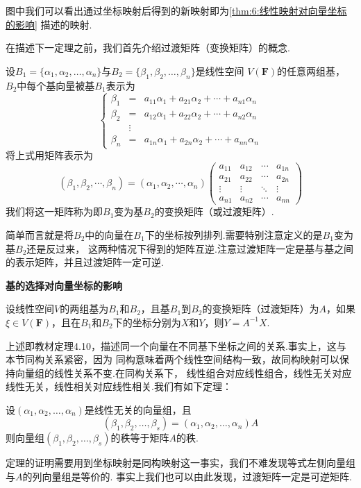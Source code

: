 图中我们可以看出通过坐标映射后得到的新映射即为\autoref{thm:6:线性映射对向量坐标的影响} 描述的映射.

在描述下一定理之前，我们首先介绍过渡矩阵（变换矩阵）的概念.
\begin{definition}
    设$B_1=\{\alpha_1,\alpha_2,\ldots,\alpha_n\}$与$B_2=\{\beta_1,\beta_2,\ldots,\beta_n\}$是线性空间
    $V(\mathbf{F})$的任意两组基，$B_2$中每个基向量被基$B_1$表示为
    \[ \left\{
    \begin{array}{rcl}
        \beta_1&=&a_{11}\alpha_1+a_{21}\alpha_2+\cdots+a_{n1}\alpha_n \\
        \beta_2&=&a_{12}\alpha_1+a_{22}\alpha_2+\cdots+a_{n2}\alpha_n \\
        &\vdots& \\
        \beta_n&=&a_{1n}\alpha_1+a_{2n}\alpha_2+\cdots+a_{nn}\alpha_n
    \end{array}
    \right. \]
    将上式用矩阵表示为
    \[(\beta_1,\beta_2,\cdots,\beta_n)=(\alpha_1,\alpha_2,\cdots,\alpha_n)\begin{pmatrix}
        a_{11} & a_{12} & \cdots & a_{1n} \\
        a_{21} & a_{22} & \cdots & a_{2n} \\
        \vdots & \vdots & \ddots & \vdots \\
        a_{n1} & a_{n2} & \cdots & a_{nn}
    \end{pmatrix}\]
    我们将这一矩阵称为即$B_1$变为基$B_2$的变换矩阵（或过渡矩阵）.
\end{definition}
简单而言就是将$B_2$中的向量在$B_1$下的坐标按列排列.需要特别注意定义的是$B_1$变为基$B_2$还是反过来，
这两种情况下得到的矩阵互逆.注意过渡矩阵一定是基与基之间的表示矩阵，并且过渡矩阵一定可逆.
\begin{theorem}
    \textbf{\heiti 基的选择对向量坐标的影响}

    设线性空间$V$的两组基为$B_1$和$B_2$，且基$B_1$到$B_2$的变换矩阵（过渡矩阵）为$A$，如果
    $\xi \in V(\mathbf{F})$，且在$B_1$和$B_2$下的坐标分别为$X$和$Y$，则$Y=A^{-1}X$.
\end{theorem}
上述即教材定理4.10，描述同一个向量在不同基下坐标之间的关系.事实上，这与本节同构关系紧密，因为
同构意味着两个线性空间结构一致，故同构映射可以保持向量组的线性关系不变.在同构关系下，
线性组合对应线性组合，线性无关对应线性无关，线性相关对应线性相关.我们有如下定理：

\begin{theorem}
    设$(\alpha_1,\alpha_2,\ldots,\alpha_n)$是线性无关的向量组，且
    \[(\beta_1,\beta_2,\ldots,\beta_s)=(\alpha_1,\alpha_2,\ldots,\alpha_n)A\]
    则向量组$(\beta_1,\beta_2,\ldots,\beta_s)$的秩等于矩阵$A$的秩.
\end{theorem}
定理的证明需要用到坐标映射是同构映射这一事实，我们不难发现等式左侧向量组与$A$的列向量组是等价的.
事实上我们也可以由此发现，过渡矩阵一定是可逆矩阵.


